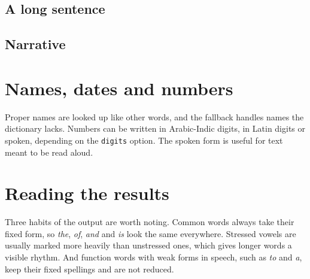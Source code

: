 \subsection{A long sentence}


\subsection{Narrative}


\section{Names, dates and numbers}
Proper names are looked up like other words, and the fallback handles names the dictionary lacks. Numbers can be written in Arabic-Indic digits, in Latin digits or spoken, depending on the \texttt{digits} option. The spoken form is useful for text meant to be read aloud.




\section{Reading the results}
Three habits of the output are worth noting. Common words always take their fixed form, so \emph{the}, \emph{of}, \emph{and} and \emph{is} look the same everywhere. Stressed vowels are usually marked more heavily than unstressed ones, which gives longer words a visible rhythm. And function words with weak forms in speech, such as \emph{to} and \emph{a}, keep their fixed spellings and are not reduced.
